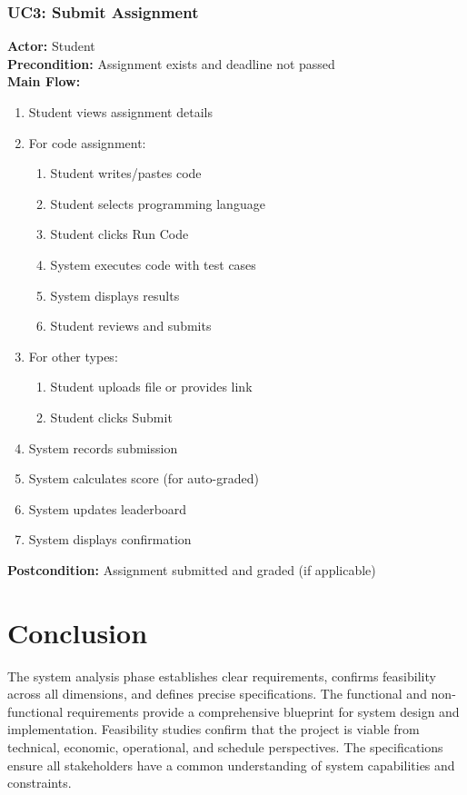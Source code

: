 \subsubsection{UC3: Submit Assignment}
\textbf{Actor:} Student\\
\textbf{Precondition:} Assignment exists and deadline not passed\\
\textbf{Main Flow:}
\begin{enumerate}
\item Student views assignment details
\item For code assignment:
    \begin{enumerate}
    \item Student writes/pastes code
    \item Student selects programming language
    \item Student clicks Run Code
    \item System executes code with test cases
    \item System displays results
    \item Student reviews and submits
    \end{enumerate}
\item For other types:
    \begin{enumerate}
    \item Student uploads file or provides link
    \item Student clicks Submit
    \end{enumerate}
\item System records submission
\item System calculates score (for auto-graded)
\item System updates leaderboard
\item System displays confirmation
\end{enumerate}
\textbf{Postcondition:} Assignment submitted and graded (if applicable)

\section{Conclusion}

The system analysis phase establishes clear requirements, confirms feasibility across all dimensions, and defines precise specifications. The functional and non-functional requirements provide a comprehensive blueprint for system design and implementation. Feasibility studies confirm that the project is viable from technical, economic, operational, and schedule perspectives. The specifications ensure all stakeholders have a common understanding of system capabilities and constraints.

\newpage
